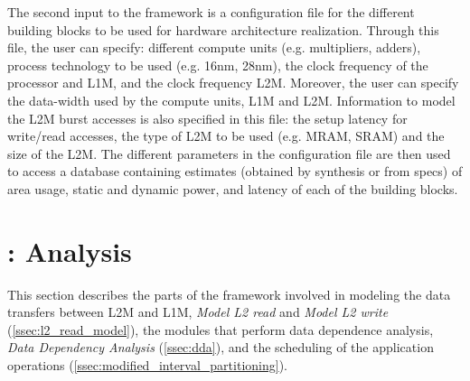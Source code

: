 \label{ssec:conf_param}
The second input to the framework is a configuration file for the different building blocks to be used for hardware architecture realization. Through this file, the user can specify: different compute units (e.g. multipliers, adders), process technology to be used (e.g. 16nm, 28nm), the clock frequency of the processor and L1M, and the clock frequency L2M. Moreover, the user can specify the data-width used by the compute units, L1M and L2M.
Information to model the L2M burst accesses is also specified in this file: the setup latency for write/read accesses, the type of L2M to be used (e.g. MRAM, SRAM) and the size of the L2M. The different parameters in the configuration file are then used to access a database containing estimates (obtained by synthesis or from specs) of area usage, static and dynamic power, and latency of each of the building blocks. %

%

\vspace{-1mm}
\section{\frameworkname: Analysis}
This section describes the parts of the framework involved in modeling the data transfers between L2M and L1M, \textit{Model L2 read} and \textit{Model L2 write} (\ref{ssec:l2_read_model}), the modules that perform data dependence analysis, \textit{Data Dependency Analysis} (\ref{ssec:dda}), and the scheduling of the application operations (\ref{ssec:modified_interval_partitioning}).
\vspace{-1mm}
